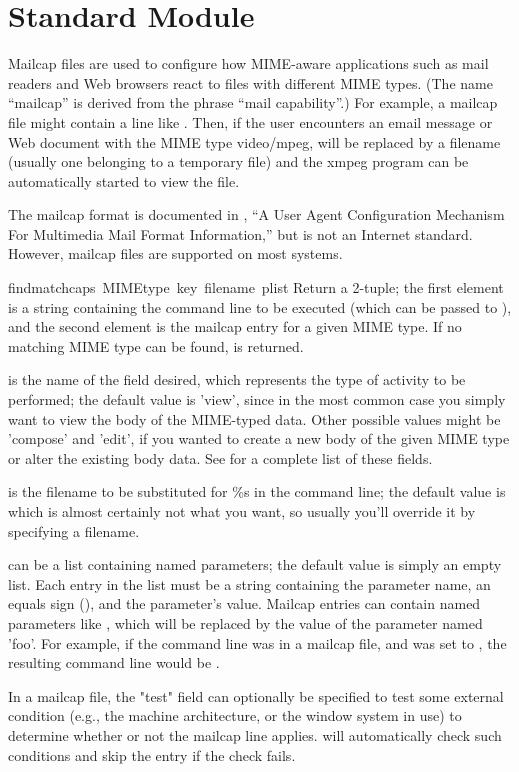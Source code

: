 \section{Standard Module }
\label{module-mailcap}

Mailcap files are used to configure how MIME-aware applications such
as mail readers and Web browsers react to files with different MIME
types. (The name ``mailcap'' is derived from the phrase ``mail
capability''.)  For example, a mailcap file might contain a line like
.  Then, if the user encounters an email
message or Web document with the MIME type video/mpeg,  will be
replaced by a filename (usually one belonging to a temporary file) and
the xmpeg program can be automatically started to view the file.

The mailcap format is documented in , ``A User Agent
Configuration Mechanism For Multimedia Mail Format Information,'' but
is not an Internet standard.  However, mailcap files are supported on
most \UNIX{} systems.

\begin{funcdesc}{findmatch}{caps\, MIMEtype\, key\, filename\, plist}
Return a 2-tuple; the first element is a string containing the command
line to be executed
(which can be passed to ), and the second element is
the mailcap entry for a given MIME type.  If no matching MIME
type can be found,  is returned.

 is the name of the field desired, which represents the type
of activity to be performed; the default value is 'view', since in the 
most common case you simply want to view the body of the MIME-typed
data.  Other possible values might be 'compose' and 'edit', if you
wanted to create a new body of the given MIME type or alter the
existing body data.  See  for a complete list of these
fields.

 is the filename to be substituted for \%s in the
command line; the default value is
 which is almost certainly not what you want, so
usually you'll override it by specifying a filename.

 can be a list containing named parameters; the default
value is simply an empty list.  Each entry in the list must be a
string containing the parameter name, an equals sign (\code{=}), and the
parameter's value.  Mailcap entries can contain 
named parameters like , which will be replaced by the
value of the parameter named 'foo'.  For example, if the command line
was in a mailcap file, and  was set to \code{['id=1',
'number=2', 'total=3']}, the resulting command line would be 
.  

In a mailcap file, the "test" field can optionally be specified to
test some external condition (e.g., the machine architecture, or the
window system in use) to determine whether or not the mailcap line
applies.   will automatically check such conditions
and skip the entry if the check fails.
\end{funcdesc}

